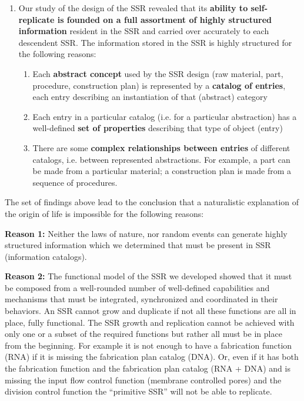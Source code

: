 \documentclass[letterpaper]{article}
\begin{document}
\begin{enumerate}
\item Our study of the design of the SSR revealed that its
\textbf{ability to self-replicate is founded on a full assortment of
highly structured information} resident in the SSR and carried over
accurately to each descendent SSR.  The information stored in the SSR
is highly structured for the following reasons:

\begin{enumerate}
\item Each \textbf{abstract concept} used by the SSR design (raw
material, part, procedure, construction plan) is represented by a
\textbf{catalog of entries}, each entry describing an instantiation of
that (abstract) category
\item Each entry in a particular catalog (i.e. for a particular
abstraction) has a well-defined \textbf{set of properties} describing
that type of object (entry)
\item There are some \textbf{complex relationships between entries} of
different catalogs, i.e. between represented abstractions. For example,
a part can be made from a particular material; a construction plan is
made from a sequence of procedures.
\end{enumerate}
\end{enumerate}
The set of findings above lead to the conclusion that a naturalistic
explanation of the origin of life is impossible for the following
reasons:


\bigskip

\textbf{Reason 1:}  Neither the laws of nature, nor random events can
generate highly structured information which we determined that must be
present in SSR (information catalogs).


\bigskip

\textbf{Reason 2:}  The functional model of the SSR we developed showed
that it must be composed from a well-rounded number of well-defined
capabilities and mechanisms that must be integrated, synchronized and
coordinated in their behaviors. An SSR cannot grow and duplicate if not
all these functions are all in place, fully functional. The SSR growth
and replication cannot be achieved with only one or a subset of the
required functions but rather all must be in place from the beginning.
For example it is not enough to have a fabrication function (RNA) if it
is missing the fabrication plan catalog (DNA). Or, even if it has both
the fabrication function and the fabrication plan catalog (RNA + DNA)
and is missing the input flow control function (membrane controlled
pores) and the division control function the “primitive SSR” will not
be able to replicate.
\end{document}
